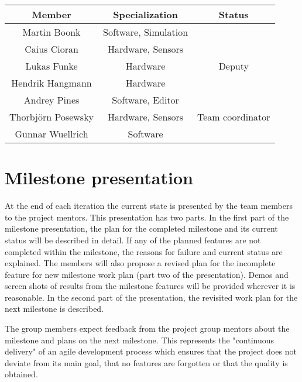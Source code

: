 \begin{center}
\begin{tabular}{c|c|c}
\hline
Member & Specialization & Status \\
\hline
\hline
Martin Boonk & Software, Simulation &  \\ 
\hline
Caius Cioran & Hardware, Sensors &  \\ 
\hline
Lukas Funke & Hardware & Deputy \\ 
\hline
Hendrik Hangmann & Hardware \\ %
\hline
Andrey Pines & Software, Editor &  \\ 
\hline
Thorbj\"orn Posewsky & Hardware, Sensors & Team coordinator \\ 
\hline
Gunnar Wuellrich & Software \\ %
\hline 
\end{tabular}
\end{center}

\section{Milestone presentation}

At the end of each iteration the current state is presented by the team members to the project mentors. This presentation has two parts.
In the ﬁrst part of the milestone presentation, the plan for the completed milestone and its current status will be described in detail.
If any of the planned features are not completed within the milestone, the reasons for failure and current status are explained.
The members will also propose a revised plan for the incomplete feature for new milestone work plan (part two of the presentation).
Demos and screen shots of results from the milestone features will be provided wherever it is reasonable.
In the second part of the presentation, the revisited work plan for the next milestone is described.

The group members expect feedback from the project group mentors about the milestone and plans on the next milestone.
This represents the "continuous delivery" of an agile development process which ensures that the project does not deviate from its main goal,
that no features are forgotten or that the quality is obtained.